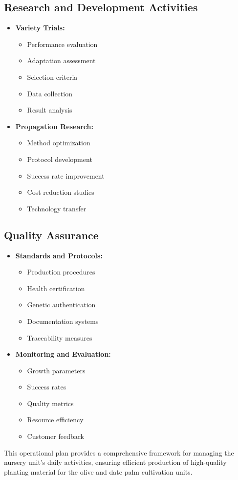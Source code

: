 \subsection{Research and Development Activities}
\begin{itemize}
    \item \textbf{Variety Trials:}
    \begin{itemize}
        \item Performance evaluation
        \item Adaptation assessment
        \item Selection criteria
        \item Data collection
        \item Result analysis
    \end{itemize}
    
    \item \textbf{Propagation Research:}
    \begin{itemize}
        \item Method optimization
        \item Protocol development
        \item Success rate improvement
        \item Cost reduction studies
        \item Technology transfer
    \end{itemize}
\end{itemize}

\subsection{Quality Assurance}
\begin{itemize}
    \item \textbf{Standards and Protocols:}
    \begin{itemize}
        \item Production procedures
        \item Health certification
        \item Genetic authentication
        \item Documentation systems
        \item Traceability measures
    \end{itemize}
    
    \item \textbf{Monitoring and Evaluation:}
    \begin{itemize}
        \item Growth parameters
        \item Success rates
        \item Quality metrics
        \item Resource efficiency
        \item Customer feedback
    \end{itemize}
\end{itemize}

This operational plan provides a comprehensive framework for managing the nursery unit's daily activities, ensuring efficient production of high-quality planting material for the olive and date palm cultivation units. 